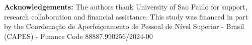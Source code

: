 \documentclass[10pt]{article}
\begin{document}
\vspace{24pt}

\begin{flushleft}


\end{flushleft}




\vspace{6pt}

\vspace{12pt}
\textbf{Acknowledgements:} The authors thank University of Sao Paulo for support, research collaboration and financial assistance.
This study was financed in part by the Coordenação de Aperfeiçoamento de Pessoal de Nível Superior - Brasil (CAPES) -
Finance Code 88887.990256/2024-00
\end{document}
